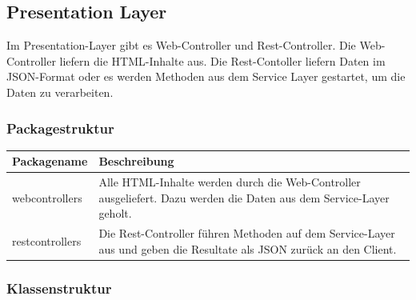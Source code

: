 \newpage

\subsection{Presentation Layer}


Im Presentation-Layer gibt es Web-Controller und Rest-Controller. Die Web-Controller liefern die HTML-Inhalte aus. Die Rest-Contoller liefern Daten im JSON-Format oder es werden Methoden aus dem Service Layer gestartet, um die Daten zu verarbeiten.


\subsubsection{Packagestruktur}


\begin{table}[H]
\centering
    \begin{tabular}{@{}l p{14.1cm} @{}}\toprule    
    {Packagename} & {Beschreibung}\\ \midrule
    webcontrollers & Alle HTML-Inhalte werden durch die Web-Controller ausgeliefert. Dazu werden die Daten aus dem Service-Layer geholt.\\       
    restcontrollers & Die Rest-Controller führen Methoden auf dem Service-Layer aus und geben die Resultate als JSON zurück an den Client. \\
    \bottomrule
    \end{tabular}
\end{table}

\subsubsection{Klassenstruktur}

